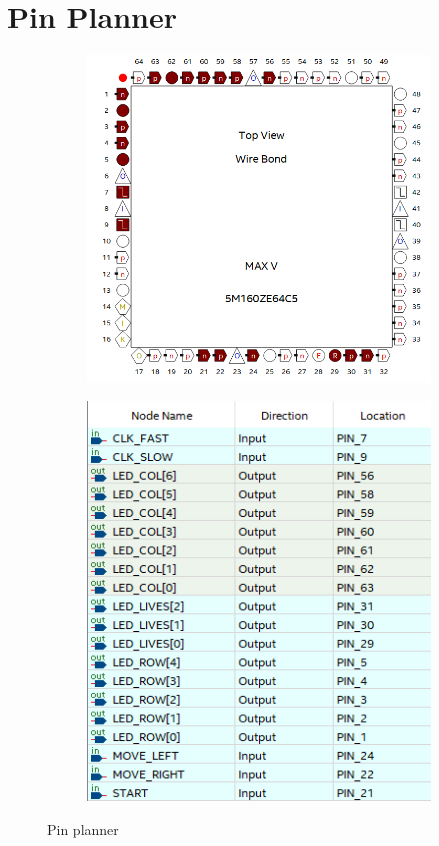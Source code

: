 \section{Pin Planner}
\begin{figure}[h!]
  \centering
  \begin{subfigure}{0.45\linewidth}
    \includegraphics[width=\linewidth]{Ressources/png/pinPlanner.png}
    \caption{}
  \end{subfigure}
  \begin{subfigure}{0.45\linewidth}
    \includegraphics[width=\linewidth]{Ressources/png/pins.png}
    \caption{}
  \end{subfigure}
  \caption{Pin planner}
  \label{Pin planner}
\end{figure}